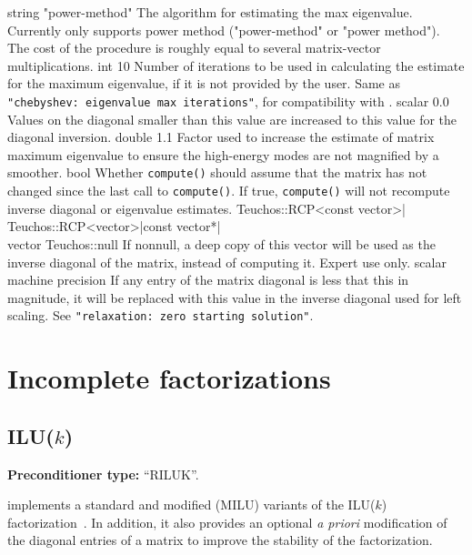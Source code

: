     {string}
    {"power-method"}
    {The algorithm for estimating the max eigenvalue. Currently only supports
     power method ("power-method" or "power method"). The cost of the procedure is
     roughly equal to several matrix-vector multiplications.}
    {int}
    {10}
    {Number of iterations to be used in calculating the estimate for the maximum
     eigenvalue, if it is not provided by the user.}
    {Same as {\tt "chebyshev: eigenvalue max iterations"}, for compatibility with \ml{}.}
    {scalar}
    {0.0}
    {Values on the diagonal smaller than this value are increased to this value
     for the diagonal inversion.}
    {double}
    {1.1}
    {Factor used to increase the estimate of matrix maximum eigenvalue to ensure
    the high-energy modes are not magnified by a smoother.}
    {bool}
    {\false}
    {Whether \texttt{compute()} should assume that the matrix has not changed
     since the last call to \texttt{compute()}. If true, \texttt{compute()}
     will not recompute inverse diagonal or eigenvalue estimates.}
    {Teuchos::RCP<const vector>|\\Teuchos::RCP<vector>|const vector*|\\vector}
    {Teuchos::null}
    {If nonnull, a deep copy of this vector will be used as the inverse
     diagonal of the matrix, instead of computing it. Expert use only.}
    {scalar}
    {machine precision}
    {If any entry of the matrix diagonal is less that this in magnitude, it will
     be replaced with this value in the inverse diagonal used for left scaling.}
    {See {\tt "relaxation: zero starting solution"}.}

\section{Incomplete factorizations}

\subsection{ILU($k$)}\label{s:ILU}

\textbf{Preconditioner type:} ``RILUK''.

\ifpacktwo{} implements a standard and modified (MILU) variants of the
ILU($k$) factorization~\cite{Saad2003}. In addition, it also provides an
optional \textit{a priori} modification of the diagonal entries of a matrix to
improve the stability of the factorization.

